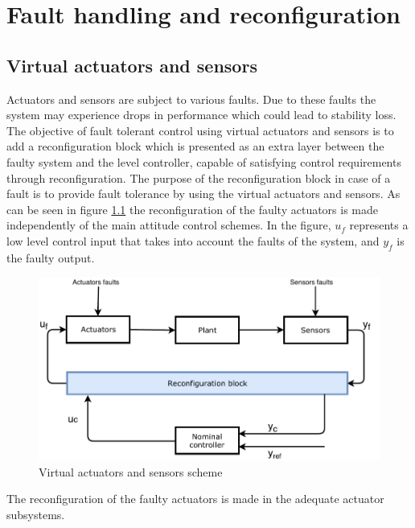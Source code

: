 \chapter{Fault handling and reconfiguration}  \label{chap:faltHandling}
 \section{Virtual actuators and sensors} \label{chap: virtual}
 Actuators and sensors are subject to various faults. Due to these faults the system may experience drops in performance which could lead to stability loss. The objective of fault tolerant control using virtual actuators and sensors is to add a reconfiguration block which is presented as an extra layer between the faulty system and the level controller, capable of satisfying control requirements through reconfiguration. The purpose of the reconfiguration block in case of a fault is to provide fault tolerance by using the virtual actuators and sensors. As can be seen in figure \ref{fig:VA} the reconfiguration of the faulty actuators is made independently of the main attitude control schemes.  In the figure, $u_f$ represents a low level control input that takes into account the faults of the system, and $y_f$ is the faulty output. 
 \begin{figure}[H]
 	\centering
 	\includegraphics[width=0.8\linewidth]{figures/VirtualActuator}
 	\caption{ Virtual actuators and sensors scheme}
 	\label{fig:VA}
 \end{figure}
 
 The reconfiguration of the faulty actuators is made in the adequate actuator subsystems. 
 

% 

